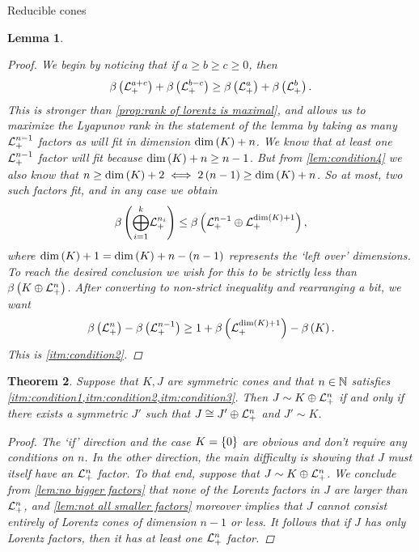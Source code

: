 \documentclass{interact}
\theoremstyle{plain}
\newtheorem{theorem}{Theorem}[section]
\newtheorem{lemma}[theorem]{Lemma}
\theoremstyle{definition}
\theoremstyle{remark}
\begin{document}
\begin{section}{Reducible cones}
\begin{lemma}
      \begin{proof}
        We begin by noticing that if $a \ge b \ge c \ge 0$, then
        \begin{equation*}
          \lyapunovrank{\Lnplus[a+c]} + \lyapunovrank{\Lnplus[b-c]}
          \ge
          \lyapunovrank{\Lnplus[a]} + \lyapunovrank{\Lnplus[b]}.
        \end{equation*}
        This is stronger than \cref{prop:rank of lorentz is maximal},
        and allows us to maximize the Lyapunov rank in the statement
        of the lemma by taking as many $\Lnplus[n-1]$ factors as will
        fit in dimension $\dim\of{K} + n$. We know that at least one
        $\Lnplus[n-1]$ factor will fit because $\dim\of{K} + n \ge
        n-1$. But from \cref{lem:condition4} we also know that $n \ge
        \dim\of{K} + 2 \iff 2\qty{n - 1} \ge \dim\of{K} + n$. So at
        most, two such factors fit, and in any case we obtain
        \begin{equation*}
          \lyapunovrank{\directsummany{i=1}{k}{\Lnplus[n_{i}]}}
          \le
          \lyapunovrank{\directsum{\Lnplus[n-1]}{\Lnplus[\dim\of{K}+1]}},
        \end{equation*}
        where $\dim\of{K} + 1 = \dim\of{K} + n - \qty{n-1}$ represents
        the `left over' dimensions. To reach the desired conclusion
        we wish for this to be strictly less than
        $\lyapunovrank{\directsum{K}{\Lnplus}}$. After converting to
        non-strict inequality and rearranging a bit, we want
        \begin{equation*}
          \lyapunovrank{\Lnplus} - \lyapunovrank{\Lnplus[n-1]}
          \ge
          1 + \lyapunovrank{\Lnplus[\dim\of{K}+1]} - \lyapunovrank{K}.
        \end{equation*}
        This is \cref{itm:condition2}.
      \end{proof}
    \end{lemma}

    \begin{theorem}\label{thm:subproblem reduction}
      Suppose that $K,J$ are symmetric cones and that $n \in \Nn[1]$
      satisfies \cref{itm:condition1,itm:condition2,itm:condition3}.
      Then $J \sim \directsum{K}{\Lnplus}$ if and only if there exists
      a symmetric $J'$ such that $J \cong \directsum{J'}{\Lnplus}$ and
      $J' \sim K$.

      \begin{proof}
        The `if' direction and the case $K = \set{0}$ are obvious
        and don't require any conditions on $n$. In the other
        direction, the main difficulty is showing that $J$ must itself
        have an $\Lnplus$ factor. To that end, suppose that $J \sim
        \directsum{K}{\Lnplus}$. We conclude from \cref{lem:no bigger
          factors} that none of the Lorentz factors in $J$ are larger
        than $\Lnplus$, and \cref{lem:not all smaller factors}
        moreover implies that $J$ cannot consist entirely of Lorentz
        cones of dimension $n-1$ or less. It follows that if $J$ has
        only Lorentz factors, then it has at least one $\Lnplus$
        factor.


\end{proof}
\end{theorem}
\end{section}
\end{document}
